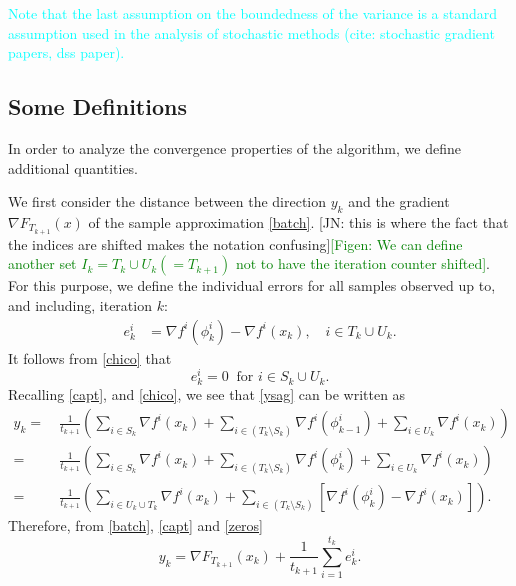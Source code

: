 \documentclass[11pt]{article}
\begin{document}
\textcolor{cyan}{Note that the last assumption on the boundedness of the variance is a standard assumption used in the analysis of stochastic methods (cite: stochastic gradient papers, dss paper).}


\subsection{Some Definitions}

In order to analyze the convergence properties  of the algorithm, we  define additional quantities.

We first consider the distance between the direction $y_k$ and the gradient {\color{blue} $\nabla F_{T_{k+1}}(x)$} of the sample approximation \eqref{batch}. {\color{blue} [JN: this is where the fact that the indices are shifted makes the notation confusing]}\textcolor{green}{[Figen: We can define another set $I_k=T_k\cup U_k(= T_{k+1})$ not to have the iteration counter shifted]}. For this purpose, we define the individual errors for all samples observed up to, and including,  iteration $k$:  
\begin{align} \label{eri}
 e_k^i &= \nabla f^i(\phi_{k}^i)-\nabla f^i(x_k), \quad i\in T_k \cup U_k.
\end{align}
It follows from 
\eqref{chico} that 
\begin{equation}   \label{zeros}
       e_k^i = 0 \  \mbox{ for } i \in S_k \cup U_k.
\end{equation}
%
{\color{blue} Recalling \eqref{capt}, and \eqref{chico}, we see that  \eqref{ysag} can be written as}
 \begin{align}  \label{gk_sag2}
       y_k = & \  \frac{1}{t_{k+1}} \left(\sum_{i \in S_k} \nabla f^i(x_{k}) +\sum_{i\in (T_k \setminus S_k)} \nabla f^i (\phi^i_{k-1}) + \sum_{i \in U_k}  \nabla f^i(x_k)\right) \\
       = & \ \frac{1}{t_{k+1}} \left(\sum_{i \in S_k} \nabla f^i(x_{k}) +\sum_{i\in (T_k \setminus S_k)} \nabla f^i (\phi^i_{k}) + \sum_{i \in U_k}  \nabla f^i(x_k)\right) \\
       = &\  \frac{1}{t_{k+1}} \left(\sum_{i \in U_k \cup T_k} \nabla f^i(x_{k}) +\sum_{i\in (T_k \setminus S_k)} [ \nabla f^i (\phi^i_{k})  -
        \nabla f^i(x_{k})] \right) .
 \end{align}
Therefore, from \eqref{batch}, \eqref{capt} and \eqref{zeros}
\begin{equation}\label{eq:y}
 y_k = \nabla F_{T_{k+1}}(x_k) + \frac{1}{t_{k+1}}\sum_{i=1}^{t_k} e_k^i .
\end{equation}
\end{document}
